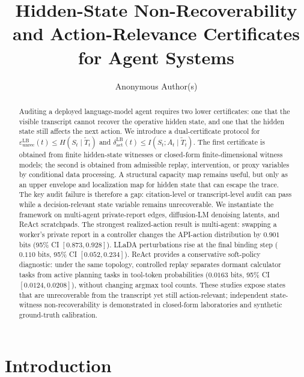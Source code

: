 \documentclass{article}
\title{Hidden-State Non-Recoverability and Action-Relevance Certificates
  for Agent Systems}
\author{
    Anonymous Author(s) \\
  }
\begin{document}
  \maketitle

  \begin{abstract}
  Auditing a deployed language-model agent requires two lower certificates:
  one that the visible transcript cannot recover the operative hidden state,
  and one that the hidden state still affects the next action. We introduce a
  dual-certificate protocol for
  $\varepsilon_\mathrm{unrec}^\mathrm{LB}(t)\leq H(S_t\mid\tilde T_t)$ and
  $\delta_\mathrm{act}^\mathrm{LB}(t)\leq I(S_t;A_t\mid\tilde T_t)$. The first
  certificate is obtained from finite hidden-state witnesses or closed-form
  finite-dimensional witness models; the second is obtained from admissible
  replay, intervention, or proxy variables by conditional data processing. A
  structural capacity map remains useful, but only as an upper envelope and
  localization map for hidden state that can escape the trace. The key audit
  failure is therefore a
  gap: citation-level or transcript-level audit can pass while a
  decision-relevant state variable remains unrecoverable. We instantiate the
  framework on multi-agent private-report edges, diffusion-LM denoising latents,
  and ReAct scratchpads. The strongest realized-action result is multi-agent:
  swapping a worker's private report in a controller changes the API-action
  distribution by $0.901$ bits (95\% CI $[0.873,0.928]$). LLaDA perturbations
  rise at the final binding step ($0.110$ bits, 95\% CI $[0.052,0.234]$).
  ReAct provides a conservative soft-policy diagnostic: under the same topology,
  controlled replay separates dormant calculator tasks from active planning
  tasks in tool-token probabilities ($0.0163$ bits, 95\% CI
  $[0.0124,0.0208]$), without changing argmax tool counts. These studies expose
  states that are unrecoverable from the transcript yet still action-relevant;
  independent state-witness non-recoverability is demonstrated in closed-form
  laboratories and synthetic ground-truth calibration.
  \end{abstract}

  \section{Introduction}
  \label{sec:introduction}
\end{document}
